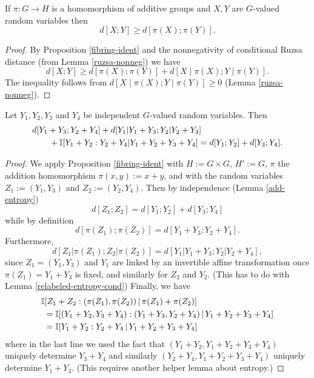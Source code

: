 \begin{corollary}\label{fibring-ineq}
  \leanok
If $\pi:G\to H$ is a homomorphism of additive groups and $X,Y$ are $G$-valued random variables then
\[d[X;Y]\geq d[\pi(X);\pi(Y)].\]
\end{corollary}

\begin{proof}
\leanok
By Proposition \ref{fibring-ident} and the nonnegativity of conditional Ruzsa distance (from Lemma \ref{ruzsa-nonneg}) we have
\[d[X;Y]\geq d[\pi(X);\pi(Y)]+d[X\mid \pi(X);Y\mid \pi(Y)].\]
The inequality follows from $d[X\mid \pi(X);Y\mid \pi(Y)]\geq 0$ (Lemma \ref{ruzsa-nonneg}).
\end{proof}


\begin{corollary}\label{cor-fibre}
  \leanok
  Let $Y_1,Y_2,Y_3$ and $Y_4$ be independent $G$-valued random variables.
  Then
\begin{align*}
  & d[Y_1+Y_3; Y_2+Y_4] + d[Y_1|Y_1+Y_3; Y_2|Y_2+Y_4] \\
  &\qquad + \mathbb{I}[Y_1+Y_2 : Y_2 + Y_4 | Y_1+Y_2+Y_3+Y_4] = d[Y_1; Y_2] + d[Y_3; Y_4].
\end{align*}
\end{corollary}

\begin{proof}
  \leanok
  We apply Proposition \ref{fibring-ident} with $H := G \times G$, $H' := G$, $\pi$ the addition homomorphism $\pi(x,y) := x+y$, and with the random variables $Z_1 := (Y_1,Y_3)$ and $Z_2 := (Y_2,Y_4)$.  Then by independence (Lemma \ref{add-entropy})
\[
  d[Z_1; Z_2] = d[Y_1; Y_2] + d[Y_3; Y_4]
\]
while by definition
\[
  d[\pi(Z_1); \pi(Z_2)] = d[Y_1+Y_3; Y_2+Y_4].
\]
Furthermore,
\[
  d[Z_1|\pi(Z_1); Z_2|\pi(Z_2)] = d[Y_1|Y_1+Y_3;Y_2|Y_2+Y_4],
\]
since $Z_1=(Y_1,Y_3)$ and $Y_1$ are linked by an invertible affine transformation once $\pi(Z_1)=Y_1+Y_3$ is fixed, and similarly for $Z_2$ and $Y_2$.  (This has to do with Lemma \ref{relabeled-entropy-cond})
Finally, we have
\begin{align*}
  &\mathbb{I}[Z_1 + Z_2 : (\pi(Z_1),\pi(Z_2)) \,|\, \pi(Z_1) + \pi(Z_2)] \\
  &\ = \mathbb{I}[(Y_1+Y_2, Y_3+Y_4) : (Y_1+Y_3, Y_2+Y_4) \,|\, Y_1+Y_2+Y_3+Y_4] \\
  &\ = \mathbb{I}[Y_1+Y_2 : Y_2+Y_4 \,|\, Y_1+Y_2+Y_3+Y_4]
\end{align*}
where in the last line we used the fact that $(Y_1+Y_2, Y_1+Y_2+Y_3+Y_4)$ uniquely determine $Y_3+Y_4$ and similarly
$(Y_2+Y_4, Y_1+Y_2+Y_3+Y_4)$ uniquely determine $Y_1+Y_3$.  (This requires another helper lemma about entropy.)
\end{proof}
